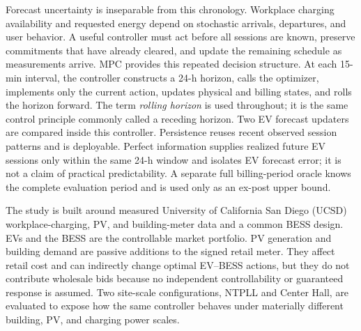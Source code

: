 \documentclass[final,5p,times]{elsarticle}
\begin{document}
Forecast uncertainty is inseparable from this chronology. Workplace charging availability and requested energy depend on stochastic arrivals, departures, and user behavior. A useful controller must act before all sessions are known, preserve commitments that have already cleared, and update the remaining schedule as measurements arrive. MPC provides this repeated decision structure. At each 15-min interval, the controller constructs a 24-h horizon, calls the optimizer, implements only the current action, updates physical and billing states, and rolls the horizon forward. The term \emph{rolling horizon} is used throughout; it is the same control principle commonly called a receding horizon. Two EV forecast updaters are compared inside this controller. Persistence reuses recent observed session patterns and is deployable. Perfect information supplies realized future EV sessions only within the same 24-h window and isolates EV forecast error; it is not a claim of practical predictability. A separate full billing-period oracle knows the complete evaluation period and is used only as an ex-post upper bound.

The study is built around measured University of California San Diego (UCSD) workplace-charging, PV, and building-meter data and a common BESS design. EVs and the BESS are the controllable market portfolio. PV generation and building demand are passive additions to the signed retail meter. They affect retail cost and can indirectly change optimal EV--BESS actions, but they do not contribute wholesale bids because no independent controllability or guaranteed response is assumed. Two site-scale configurations, NTPLL and Center Hall, are evaluated to expose how the same controller behaves under materially different building, PV, and charging power scales.
\end{document}
